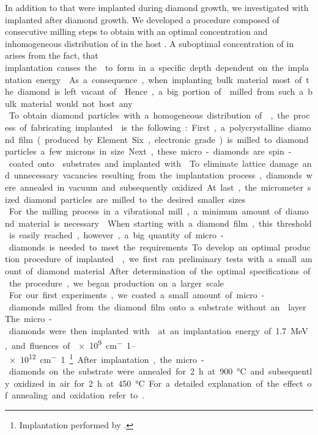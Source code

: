 		In addition to \sivs that were implanted during diamond growth, we investigated \nds with \sivs implanted after diamond growth.
		We developed a procedure composed of consecutive milling steps to obtain \nds with an optimal concentration and inhomogeneous distribution of \sivs in the host \nds.
		A suboptimal concentration of \sivs in \nds arises from the fact, that \si implantation causes the \sivs to form in a specific depth dependent on the implantation energy.
		As a consequence, when implanting bulk material most of the diamond is left vacant of \sivs.
		Hence, a big portion of \nds milled from such a bulk material would not host any \sivs.
		\\
		To obtain diamond particles with a homogeneous distribution of \sivs, the process of fabricating implanted \nds is the following:
		First, a polycrystalline diamond film (produced by Element Six, electronic grade) is milled to diamond particles a few microns in size.
		Next, these micro-diamonds are spin-coated onto \ir substrates and implanted with .
		To eliminate lattice damage and unnecessary vacancies resulting from the implantation process, diamonds were annealed in vacuum and subsequently oxidized.
		At last, the micrometer sized diamond particles are milled to the desired smaller sizes.
		\\
		For the milling process in a vibrational mill, a minimum amount of diamond material is necessary.
		When starting with a diamond film, this threshold is easily reached, however, a big quantity of micro-diamonds is needed to meet the requirements.
		To develop an optimal production procedure of implanted \nds, we first ran preliminary tests with a small amount of diamond material.
		After determination of the optimal specifications of the procedure, we began production on a larger scale.
		\\
		For our first experiments, we coated a small amount of micro-diamonds milled from the diamond film onto a \si substrate without an \ir layer.
		The micro-diamonds were then implanted with  at an implantation energy of \SI{1.7}{MeV}, and fluences of \SIrange{e9}{e12}{cm^-1}\footnote{Implantation performed by \rogalla.}.
		After implantation, the micro-diamonds on the \si substrate were annealed for \SI{2}{\hour} at \SI{900}{\celsius} and subsequently oxidized in air for \SI{2}{\hour} at \SI{450}{\celsius}. For a detailed explanation of the effect of annealing and oxidation refer to .
